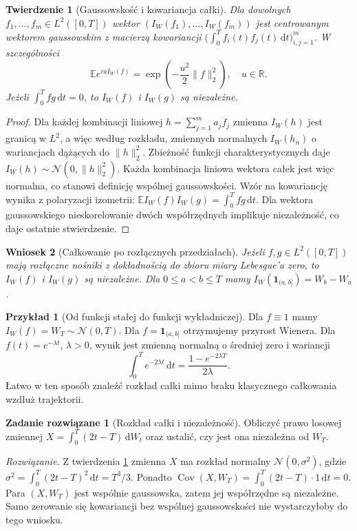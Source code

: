 \documentclass[11pt,a4paper,oneside]{report}
\numberwithin{equation}{chapter}
\theoremstyle{plain}
\newtheorem{twierdzenie}{Twierdzenie}[chapter]
\newtheorem{wniosek}[twierdzenie]{Wniosek}
\theoremstyle{definition}
\newtheorem{przyklad}{Przykład}[chapter]
\newtheorem{zadanie}{Zadanie rozwiązane}[chapter]
\theoremstyle{remark}
\newcommand{\R}{\mathbb{R}}
\newcommand{\E}{\mathbb{E}}
\newcommand{\Cov}{\operatorname{Cov}}
\newcommand{\ind}[1]{\mathbf{1}_{#1}}
\newcommand{\dd}{\mathrm{d}}
\newcommand{\norm}[1]{\lVert #1\rVert}
\newcommand{\Normal}{\mathcal{N}}
\begin{document}
\begin{twierdzenie}[Gaussowskość i kowariancja całki]\label{th:wiener-gaussian}
Dla dowolnych $f_1,\ldots,f_m\in L^2([0,T])$ wektor
$(I_W(f_1),\ldots,I_W(f_m))$ jest centrowanym wektorem gaussowskim
z macierzą kowariancji
$\big(\int_0^T f_i(t)f_j(t)\,\dd t\big)_{i,j=1}^m$.
W szczególności
\[
\E e^{iuI_W(f)}=\exp\left(-\frac{u^2}{2}\norm{f}_2^2\right),
\quad u\in\R.
\tag{1.4}
\]
Jeżeli $\int_0^Tfg\,\dd t=0$, to $I_W(f)$ i $I_W(g)$
są niezależne.
\end{twierdzenie}
\begin{proof}
Dla każdej kombinacji liniowej $h=\sum_{j=1}^ma_jf_j$
zmienna $I_W(h)$ jest granicą w $L^2$, a więc według
rozkładu, zmiennych normalnych $I_W(h_n)$ o wariancjach
dążących do $\norm{h}_2^2$. Zbieżność funkcji
charakterystycznych daje $I_W(h)\sim\Normal(0,\norm{h}_2^2)$.
Każda kombinacja liniowa wektora całek jest więc normalna,
co stanowi definicję wspólnej gaussowskości. Wzór na kowariancję
wynika z polaryzacji izometrii:
$\E I_W(f)I_W(g)=\int_0^Tfg\,\dd t$.
Dla wektora gaussowskiego nieskorelowanie dwóch współrzędnych
implikuje niezależność, co daje ostatnie stwierdzenie.
\end{proof}

\begin{wniosek}[Całkowanie po rozłącznych przedziałach]
Jeżeli $f,g\in L^2([0,T])$ mają rozłączne nośniki z dokładnością
do zbioru miary Lebesgue'a zero, to $I_W(f)$ i $I_W(g)$
są niezależne. Dla $0\le a<b\le T$ mamy
$I_W(\ind{(a,b]})=W_b-W_a$.
\end{wniosek}

\begin{przyklad}[Od funkcji stałej do funkcji wykładniczej]
Dla $f\equiv1$ mamy $I_W(f)=W_T\sim\Normal(0,T)$.
Dla $f=\ind{(a,b]}$ otrzymujemy przyrost Wienera.
Dla $f(t)=e^{-\lambda t}$, $\lambda>0$, wynik jest
zmienną normalną o średniej zero i wariancji
\[
\int_0^Te^{-2\lambda t}\,\dd t
=\frac{1-e^{-2\lambda T}}{2\lambda}.
\]
Łatwo w ten sposób znaleźć rozkład całki mimo braku
klasycznego całkowania wzdłuż trajektorii.
\end{przyklad}

\begin{zadanie}[Rozkład całki i niezależność]
Obliczyć prawo losowej zmiennej
$X=\int_0^T(2t-T)\,\dd W_t$ oraz ustalić,
czy jest ona niezależna od $W_T$.

\emph{Rozwiązanie.}
Z twierdzenia \ref{th:wiener-gaussian} zmienna $X$ ma rozkład
normalny $\Normal(0,\sigma^2)$, gdzie
$\sigma^2=\int_0^T(2t-T)^2\,\dd t=T^3/3$.
Ponadto
$\Cov(X,W_T)=\int_0^T(2t-T)\cdot1\,\dd t=0$.
Para $(X,W_T)$ jest wspólnie gaussowska, zatem jej
współrzędne są niezależne. Samo zerowanie się kowariancji
bez wspólnej gaussowskości nie wystarczyłoby do tego wniosku.
\end{zadanie}
\end{document}
